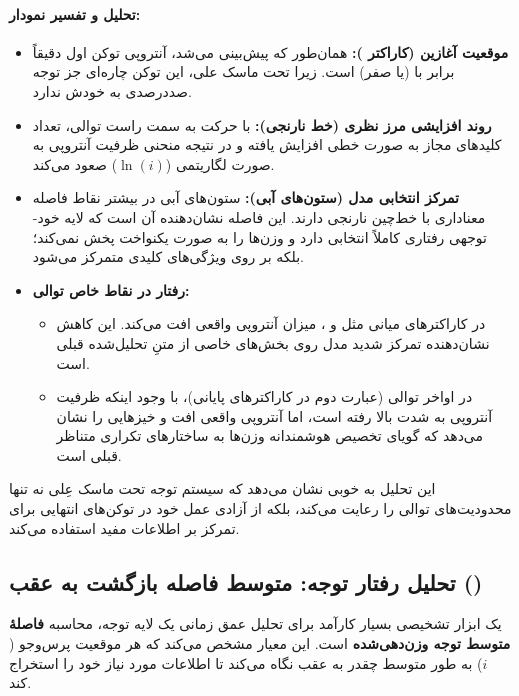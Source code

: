 \documentclass{article}
\begin{document}
\paragraph{تحلیل و تفسیر نمودار:}
\begin{itemize}
	\item \textbf{موقعیت آغازین (کاراکتر ):} همان‌طور که پیش‌بینی می‌شد، آنتروپی توکن اول دقیقاً برابر با  (یا صفر) است. زیرا تحت ماسک علی، این توکن چاره‌ای جز توجه صددرصدی به خودش ندارد.
	\item \textbf{روند افزایشی مرز نظری (خط نارنجی):} با حرکت به سمت راست توالی، تعداد کلیدهای مجاز به صورت خطی افزایش یافته و در نتیجه منحنی ظرفیت آنتروپی به صورت لگاریتمی ($\ln(i)$) صعود می‌کند.
	\item \textbf{تمرکز انتخابی مدل (ستون‌های آبی):} 
	ستون‌های آبی در بیشتر نقاط فاصله معناداری با خط‌چین نارنجی دارند. این فاصله نشان‌دهنده آن است که لایه خود-توجهی رفتاری کاملاً انتخابی دارد و وزن‌ها را به صورت یکنواخت پخش نمی‌کند؛ بلکه بر روی ویژگی‌های کلیدی متمرکز می‌شود.
	\item \textbf{رفتار در نقاط خاص توالی:}
	\begin{itemize}
		\item در کاراکترهای میانی مثل  و ، میزان آنتروپی واقعی افت می‌کند. این کاهش نشان‌دهنده تمرکز شدید مدل روی بخش‌های خاصی از متنِ تحلیل‌شده قبلی است.
		\item در اواخر توالی (عبارت دوم  در کاراکترهای پایانی)، با وجود اینکه ظرفیت آنتروپی به شدت بالا رفته است، اما آنتروپی واقعی افت و خیزهایی را نشان می‌دهد که گویای تخصیص هوشمندانه وزن‌ها به ساختارهای تکراری متناظر قبلی است.
	\end{itemize}
\end{itemize}

این تحلیل به خوبی نشان می‌دهد که سیستم توجه تحت ماسک عِلی نه تنها محدودیت‌های توالی را رعایت می‌کند، بلکه از آزادی عمل خود در توکن‌های انتهایی برای تمرکز بر اطلاعات مفید استفاده می‌کند.

\subsection{تحلیل رفتار توجه: متوسط فاصله بازگشت به عقب ()}

یک ابزار تشخیصی بسیار کارآمد برای تحلیل عمق زمانی یک لایه توجه، محاسبه \textbf{فاصلۀ متوسط توجه وزن‌دهی‌شده} است. این معیار مشخص می‌کند که هر موقعیت پرس‌وجو ($i$) به طور متوسط چقدر به عقب نگاه می‌کند تا اطلاعات مورد نیاز خود را استخراج کند. 
\end{document}
